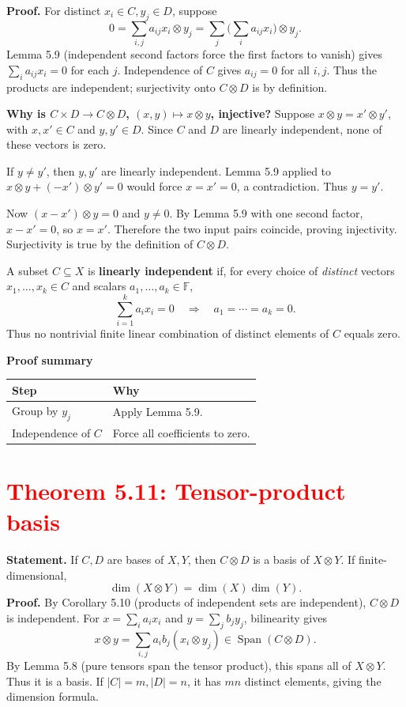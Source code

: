 \documentclass[11pt,a4paper]{article}
\newcommand{\F}{\mathbb F}
\newcommand{\prooftable}[1]{\medskip\textbf{Proof summary}\par\smallskip #1\medskip}
\begin{document}
\textbf{Proof.} For distinct \(x_i\in C,y_j\in D\), suppose
\[
0=\sum_{i,j}a_{ij}x_i\otimes y_j
=\sum_j\Big(\sum_i a_{ij}x_i\Big)\otimes y_j.
\]
Lemma 5.9 (independent second factors force the first factors to vanish) gives \(\sum_i a_{ij}x_i=0\) for each \(j\). Independence of \(C\) gives \(a_{ij}=0\) for all \(i,j\). Thus the products are independent; surjectivity onto \(C\otimes D\) is by definition.
\begin{personalnote}
\textbf{Why is \(C\times D\to C\otimes D\), \((x,y)\mapsto x\otimes y\), injective?} Suppose \(x\otimes y=x'\otimes y'\), with \(x,x'\in C\) and \(y,y'\in D\). Since \(C\) and \(D\) are linearly independent, none of these vectors is zero.

If \(y\neq y'\), then \(y,y'\) are linearly independent. Lemma 5.9 applied to
\(x\otimes y+(-x')\otimes y'=0\) would force \(x=x'=0\), a contradiction. Thus \(y=y'\).

Now \((x-x')\otimes y=0\) and \(y\neq0\). By Lemma 5.9 with one second factor, \(x-x'=0\), so \(x=x'\). Therefore the two input pairs coincide, proving injectivity. Surjectivity is true by the definition of \(C\otimes D\).
\end{personalnote}
\begin{personalnote}[title=Definitions for understanding]
A subset \(C\subseteq X\) is \textbf{linearly independent} if, for every choice of \emph{distinct} vectors \(x_1,\ldots,x_k\in C\) and scalars \(a_1,\ldots,a_k\in\F\),
\[
\sum_{i=1}^k a_ix_i=0\quad\Longrightarrow\quad a_1=\cdots=a_k=0.
\]
Thus no nontrivial finite linear combination of distinct elements of \(C\) equals zero.
\end{personalnote}
\prooftable{\begin{tabularx}{\linewidth}{@{}p{.28\linewidth}X@{}}\hline
Step & Why\\\hline
Group by \(y_j\) & Apply Lemma 5.9.\\
Independence of \(C\) & Force all coefficients to zero.\\\hline
\end{tabularx}}

\section*{\textcolor{red}{Theorem 5.11: Tensor-product basis}}
\textbf{Statement.} If \(C,D\) are bases of \(X,Y\), then \(C\otimes D\) is a basis of \(X\otimes Y\). If finite-dimensional,
\[
\boxed{\dim(X\otimes Y)=\dim(X)\dim(Y).}
\]
\textbf{Proof.} By Corollary 5.10 (products of independent sets are independent), \(C\otimes D\) is independent. For \(x=\sum_i a_ix_i\) and \(y=\sum_j b_jy_j\), bilinearity gives
\[
x\otimes y=\sum_{i,j}a_ib_j(x_i\otimes y_j)\in\operatorname{Span}(C\otimes D).
\]
By Lemma 5.8 (pure tensors span the tensor product), this spans all of \(X\otimes Y\). Thus it is a basis. If \(|C|=m,|D|=n\), it has \(mn\) distinct elements, giving the dimension formula.
\end{document}
